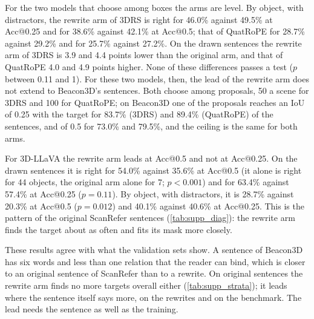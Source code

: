 For the two models that choose among boxes the arms are level.
By object, with distractors, the rewrite arm of 3DRS is right for 46.0\% against 49.5\% at Acc@0.25 and for 38.6\% against 42.1\% at Acc@0.5; that of QuatRoPE for 28.7\% against 29.2\% and for 25.7\% against 27.2\%.
On the drawn sentences the rewrite arm of 3DRS is 3.9 and 4.4 points lower than the original arm, and that of QuatRoPE 4.0 and 4.9 points higher.
None of these differences passes a test ($p$ between 0.11 and 1).
For these two models, then, the lead of the rewrite arm does not extend to Beacon3D's sentences.
Both choose among proposals, 50 a scene for 3DRS and 100 for QuatRoPE; on Beacon3D one of the proposals reaches an IoU of 0.25 with the target for 83.7\% (3DRS) and 89.4\% (QuatRoPE) of the sentences, and of 0.5 for 73.0\% and 79.5\%, and the ceiling is the same for both arms.

For 3D-LLaVA the rewrite arm leads at Acc@0.5 and not at Acc@0.25.
On the drawn sentences it is right for 54.0\% against 35.6\% at Acc@0.5 (it alone is right for 44 objects, the original arm alone for 7; $p < 0.001$) and for 63.4\% against 57.4\% at Acc@0.25 ($p = 0.11$).
By object, with distractors, it is 28.7\% against 20.3\% at Acc@0.5 ($p = 0.012$) and 40.1\% against 40.6\% at Acc@0.25.
This is the pattern of the original ScanRefer sentences (\cref{tab:supp_diag}): the rewrite arm finds the target about as often and fits its mask more closely.

These results agree with what the validation sets show.
A sentence of Beacon3D has six words and less than one relation that the reader can bind, which is closer to an original sentence of ScanRefer than to a rewrite.
On original sentences the rewrite arm finds no more targets overall either (\cref{tab:supp_strata}); it leads where the sentence itself says more, on the rewrites and on the benchmark.
The lead needs the sentence as well as the training.


